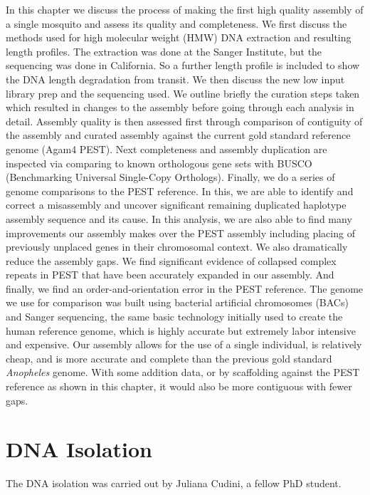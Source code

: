 \par{
In this chapter we discuss the process of making the first high quality assembly of a single mosquito and assess its quality and completeness. We first discuss the methods used for high molecular weight (HMW) DNA extraction and resulting length profiles. The extraction was done at the Sanger Institute, but the sequencing was done in California. So a further length profile is included to show the DNA length degradation from transit. We then discuss the new low input library prep and the sequencing used. We outline briefly the curation steps taken which resulted in changes to the assembly before going through each analysis in detail. Assembly quality is then assessed first through comparison of contiguity of the assembly and curated assembly against the current gold standard reference genome (Agam4 PEST). Next completeness and assembly duplication are inspected via comparing to known orthologous gene sets with BUSCO (Benchmarking Universal Single-Copy Orthologs). Finally, we do a series of genome comparisons to the PEST reference. In this, we are able to identify and correct a misassembly and uncover significant remaining duplicated haplotype assembly sequence and its cause. In this analysis, we are also able to find many improvements our assembly makes over the PEST assembly including placing of previously unplaced genes in their chromosomal context. We also dramatically reduce the assembly gaps. We find significant evidence of collapsed complex repeats in PEST that have been accurately expanded in our assembly. And finally, we find an order-and-orientation error in the PEST reference. The genome we use for comparison was built using bacterial artificial chromosomes (BACs) and Sanger sequencing, the same basic technology initially used to create the human reference genome, which is highly accurate but extremely labor intensive and expensive. Our assembly allows for the use of a single individual, is relatively cheap, and is more accurate and complete than the previous gold standard \textit{Anopheles} genome. With some addition data, or by scaffolding against the PEST reference as shown in this chapter, it would also be more contiguous with fewer gaps.
}

\section{DNA Isolation}

The DNA isolation was carried out by Juliana Cudini, a fellow PhD student. \\

